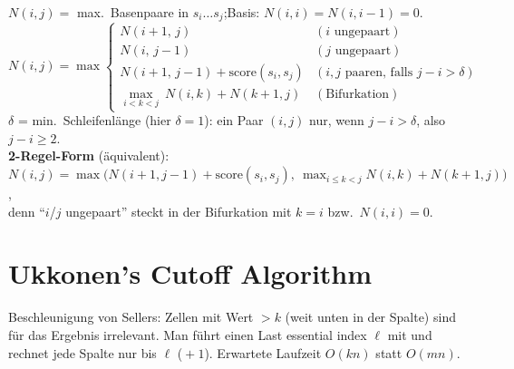 \begin{zsmf}
    $N(i,j)=$ max.\ Basenpaare in $s_i\ldots s_j$;\quad Basis: $N(i,i)=N(i,i{-}1)=0$.
    \[
        N(i,j)=\max\begin{cases}
                       N(i+1,\,j) & (i \text{ ungepaart})\\
                       N(i,\,j-1) & (j \text{ ungepaart})\\
                       N(i+1,\,j-1)+\text{score}(s_i,s_j) & (i,j \text{ paaren, falls } j-i>\delta)\\
                       \displaystyle\max_{i<k<j}\ N(i,k)+N(k+1,j) & (\text{Bifurkation})
        \end{cases}
    \]
    $\delta$ = min.\ Schleifenl\"ange (hier $\delta=1$): ein Paar $(i,j)$ nur, wenn $j-i>\delta$, also $j-i\ge2$.\\
    \textbf{2-Regel-Form} (\"aquivalent): $N(i,j)=\max\bigl(N(i+1,j-1)+\text{score}(s_i,s_j),\ \max_{i\le k<j}N(i,k)+N(k+1,j)\bigr)$,\\
    denn "`$i$/$j$ ungepaart"' steckt in der Bifurkation mit $k=i$ bzw.\ $N(i,i)=0$.
\end{zsmf}



\section{Ukkonen’s Cutoff Algorithm}\label{sec:ukkonens-cutoff-algorithm}

\begin{idee}
    Beschleunigung von Sellers: Zellen mit Wert $>k$ (weit unten in der Spalte) sind für das Ergebnis
    irrelevant.
    Man führt einen Last essential index $\ell$ mit und rechnet jede Spalte
    nur bis $\ell$ (${}+1$). Erwartete Laufzeit $O(kn)$ statt $O(mn)$.
\end{idee}

